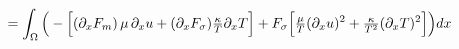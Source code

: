 \documentclass[preview]{standalone}
\newcommand{\dx}{\partial_x}
\begin{document}
\begin{align*}
\special{dvisvgm:raw <g id='unique000'>}=\int_\Omega\Big(-\Big[(\dx F_m)\,\mu\,\dx u+(\dx F_\sigma)\tfrac{\kappa}{T}\dx T\Big]+F_\sigma\Big[\tfrac{\mu}{T}(\dx u)^2+\tfrac{\kappa}{T^2}(\dx T)^2\Big]\Big)dx\special{dvisvgm:raw </g>}
\end{align*}
\end{document}
